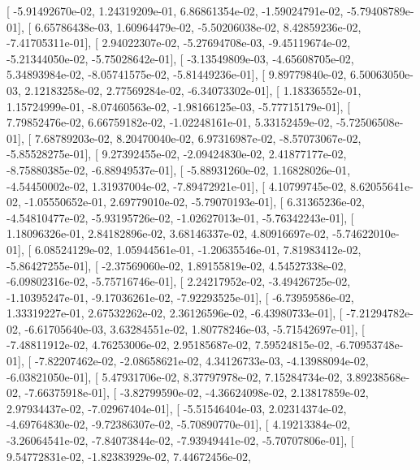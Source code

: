 \documentclass{article}
\begin{document}
       [ -5.91492670e-02,   1.24319209e-01,   6.86861354e-02,
         -1.59024791e-02,  -5.79408789e-01],
       [  6.65786438e-03,   1.60964479e-02,  -5.50206038e-02,
          8.42859236e-02,  -7.41705311e-01],
       [  2.94022307e-02,  -5.27694708e-03,  -9.45119674e-02,
         -5.21344050e-02,  -5.75028642e-01],
       [ -3.13549809e-03,  -4.65608705e-02,   5.34893984e-02,
         -8.05741575e-02,  -5.81449236e-01],
       [  9.89779840e-02,   6.50063050e-03,   2.12183258e-02,
          2.77569284e-02,  -6.34073302e-01],
       [  1.18336552e-01,   1.15724999e-01,  -8.07460563e-02,
         -1.98166125e-03,  -5.77715179e-01],
       [  7.79852476e-02,   6.66759182e-02,  -1.02248161e-01,
          5.33152459e-02,  -5.72506508e-01],
       [  7.68789203e-02,   8.20470040e-02,   6.97316987e-02,
         -8.57073067e-02,  -5.85528275e-01],
       [  9.27392455e-02,  -2.09424830e-02,   2.41877177e-02,
         -8.75880385e-02,  -6.88949537e-01],
       [ -5.88931260e-02,   1.16828026e-01,  -4.54450002e-02,
          1.31937004e-02,  -7.89472921e-01],
       [  4.10799745e-02,   8.62055641e-02,  -1.05550652e-01,
          2.69779010e-02,  -5.79070193e-01],
       [  6.31365236e-02,  -4.54810477e-02,  -5.93195726e-02,
         -1.02627013e-01,  -5.76342243e-01],
       [  1.18096326e-01,   2.84182896e-02,   3.68146337e-02,
          4.80916697e-02,  -5.74622010e-01],
       [  6.08524129e-02,   1.05944561e-01,  -1.20635546e-01,
          7.81983412e-02,  -5.86427255e-01],
       [ -2.37569060e-02,   1.89155819e-02,   4.54527338e-02,
         -6.09802316e-02,  -5.75716746e-01],
       [  2.24217952e-02,  -3.49426725e-02,  -1.10395247e-01,
         -9.17036261e-02,  -7.92293525e-01],
       [ -6.73959586e-02,   1.33319227e-01,   2.67532262e-02,
          2.36126596e-02,  -6.43980733e-01],
       [ -7.21294782e-02,  -6.61705640e-03,   3.63284551e-02,
          1.80778246e-03,  -5.71542697e-01],
       [ -7.48811912e-02,   4.76253006e-02,   2.95185687e-02,
          7.59524815e-02,  -6.70953748e-01],
       [ -7.82207462e-02,  -2.08658621e-02,   4.34126733e-03,
         -4.13988094e-02,  -6.03821050e-01],
       [  5.47931706e-02,   8.37797978e-02,   7.15284734e-02,
          3.89238568e-02,  -7.66375918e-01],
       [ -3.82799590e-02,  -4.36624098e-02,   2.13817859e-02,
          2.97934437e-02,  -7.02967404e-01],
       [ -5.51546404e-03,   2.02314374e-02,  -4.69764830e-02,
         -9.72386307e-02,  -5.70890770e-01],
       [  4.19213384e-02,  -3.26064541e-02,  -7.84073844e-02,
         -7.93949441e-02,  -5.70707806e-01],
       [  9.54772831e-02,  -1.82383929e-02,   7.44672456e-02,
\end{document}
